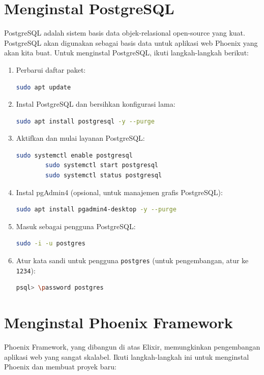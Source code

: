 \section{Menginstal PostgreSQL}
PostgreSQL adalah sistem basis data objek-relasional open-source yang kuat. PostgreSQL akan digunakan sebagai basis data untuk aplikasi web Phoenix yang akan kita buat. Untuk menginstal PostgreSQL, ikuti langkah-langkah berikut:

\begin{enumerate}
	\item Perbarui daftar paket:
	\begin{lstlisting}[language=bash]
		sudo apt update
	\end{lstlisting}
	
	\item Instal PostgreSQL dan bersihkan konfigurasi lama:
	\begin{lstlisting}[language=bash]
		sudo apt install postgresql -y --purge
	\end{lstlisting}
	
	\item Aktifkan dan mulai layanan PostgreSQL:
	\begin{lstlisting}[language=bash]
		sudo systemctl enable postgresql
		sudo systemctl start postgresql
		sudo systemctl status postgresql
	\end{lstlisting}
	
	\item Instal pgAdmin4 (opsional, untuk manajemen grafis PostgreSQL):
	\begin{lstlisting}[language=bash]
		sudo apt install pgadmin4-desktop -y --purge
	\end{lstlisting}
	
	\item Masuk sebagai pengguna PostgreSQL:
	\begin{lstlisting}[language=bash]
		sudo -i -u postgres
	\end{lstlisting}
	
	\item Atur kata sandi untuk pengguna \texttt{postgres} (untuk pengembangan, atur ke \texttt{1234}):
	\begin{lstlisting}[language=bash]
		psql> \password postgres
	\end{lstlisting}
\end{enumerate}

\section{Menginstal Phoenix Framework}
Phoenix Framework, yang dibangun di atas Elixir, memungkinkan pengembangan aplikasi web yang sangat skalabel. Ikuti langkah-langkah ini untuk menginstal Phoenix dan membuat proyek baru:

